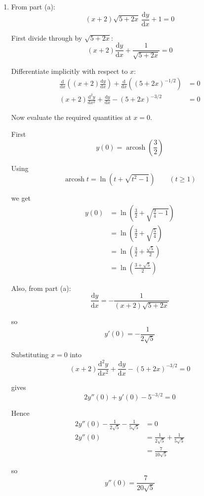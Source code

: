 \documentclass[leqno]{article}
\begin{document}
\begin{enumerate}[
  label=\textbf{\arabic*.},
  leftmargin=*,
  topsep=0pt,
  partopsep=0pt,
  parsep=0pt
]
\begin{djsSolution}
\begin{enumerate}[label=\textbf{(\alph*)}]
Therefore
\[
(x+2)\sqrt{5+2x}\,\frac{\mathrm{d}y}{\mathrm{d}x}+1=0
\]

as required.

\item From part (a):
\[
(x+2)\sqrt{5+2x}\,\frac{\mathrm{d}y}{\mathrm{d}x}+1=0
\]

First divide through by \(\sqrt{5+2x}\):
\[
(x+2)\frac{\mathrm{d}y}{\mathrm{d}x}+\frac{1}{\sqrt{5+2x}}=0
\]

Differentiate implicitly with respect to \(x\):
\begin{align*}
\frac{\mathrm{d}}{\mathrm{d}x}\left((x+2)\frac{\mathrm{d}y}{\mathrm{d}x}\right)
+\frac{\mathrm{d}}{\mathrm{d}x}\left((5+2x)^{-1/2}\right)&=0 \\
(x+2)\frac{\mathrm{d}^2y}{\mathrm{d}x^2}
+\frac{\mathrm{d}y}{\mathrm{d}x}
-(5+2x)^{-3/2}&=0
\end{align*}

Now evaluate the required quantities at \(x=0\).

First
\[
y(0)=\operatorname{arcosh}\left(\frac{3}{2}\right)
\]

Using
\[
\operatorname{arcosh} t=\ln\left(t+\sqrt{t^2-1}\right)\qquad (t\geq 1)
\]

we get
\begin{align*}
y(0)
&=\ln\left(\frac32+\sqrt{\frac94-1}\right) \\
&=\ln\left(\frac32+\sqrt{\frac54}\right) \\
&=\ln\left(\frac32+\frac{\sqrt5}{2}\right) \\
&=\ln\left(\frac{3+\sqrt5}{2}\right)
\end{align*}

Also, from part (a):
\[
\frac{\mathrm{d}y}{\mathrm{d}x}
=-\frac{1}{(x+2)\sqrt{5+2x}}
\]

so
\[
y'(0)
=-\frac{1}{2\sqrt5}
\]

Substituting \(x=0\) into
\[
(x+2)\frac{\mathrm{d}^2y}{\mathrm{d}x^2}
+\frac{\mathrm{d}y}{\mathrm{d}x}
-(5+2x)^{-3/2}=0
\]

gives
\[
2y''(0)
+y'(0)
-5^{-3/2}=0
\]

Hence
\begin{align*}
2y''(0)
-\frac{1}{2\sqrt5}
-\frac{1}{5\sqrt5}&=0 \\
2y''(0)
&=\frac{1}{2\sqrt5}+\frac{1}{5\sqrt5} \\
&=\frac{7}{10\sqrt5}
\end{align*}

so
\[
y''(0)
=\frac{7}{20\sqrt5}
\]


\end{enumerate}
\end{djsSolution}
\end{enumerate}
\end{document}
